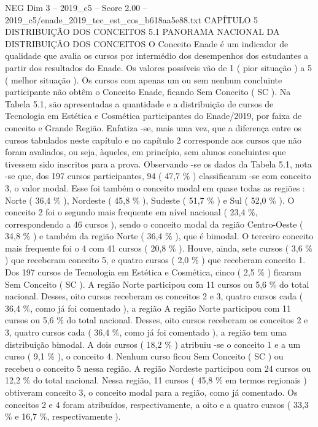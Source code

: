 \begin{textsample}{NEG Dim 3 – 2019\_c5 – Score 2.00 – 2019\_c5/enade\_2019\_tec\_est\_cos\_b618aa5e88.txt}  \label{ex:f3_neg_186}
CAPÍTULO 5 DISTRIBUIÇÃO DOS CONCEITOS 5.1 PANORAMA NACIONAL DA DISTRIBUIÇÃO DOS CONCEITOS O Conceito Enade é um indicador de qualidade que avalia os cursos por intermédio dos desempenhos dos estudantes a partir dos resultados do Enade.
Os valores possíveis vão de 1 ( pior situação ) a 5 ( melhor situação ).
Os cursos com apenas um ou sem nenhum concluinte participante não obtêm o Conceito Enade, ficando Sem Conceito ( SC ).
Na Tabela 5.1, são apresentadas a quantidade e a distribuição de cursos de Tecnologia em Estética e Cosmética participantes do Enade/2019, por faixa de conceito e Grande Região.
Enfatiza -se, mais uma vez, que a diferença entre os cursos tabulados neste capítulo e no capítulo 2 corresponde aos cursos que não foram avaliados, ou seja, àqueles, em princípio, sem alunos concluintes que tivessem sido inscritos para a prova.
Observando -se os dados da Tabela 5.1, nota -se que, dos 197 cursos participantes, 94 ( 47,7 \% ) classificaram -se com conceito 3, o valor modal.
Esse foi também o conceito modal em quase todas as regiões : Norte ( 36,4 \% ), Nordeste ( 45,8 \% ), Sudeste ( 51,7 \% ) e Sul ( 52,0 \% ).
O conceito 2 foi o segundo mais frequente em nível nacional ( 23,4 \%, correspondendo a 46 cursos ), sendo o conceito modal da região Centro-Oeste ( 34,8 \% ) e também da região Norte ( 36,4 \% ), que é bimodal.
O terceiro conceito mais frequente foi o 4 com 41 cursos ( 20,8 \% ).
Houve, ainda, sete cursos ( 3,6 \% ) que receberam conceito 5, e quatro cursos ( 2,0 \% ) que receberam conceito 1.
Dos 197 cursos de Tecnologia em Estética e Cosmética, cinco ( 2,5 \% ) ficaram Sem Conceito ( SC ).
A região Norte participou com 11 cursos ou 5,6 \% do total nacional.
Desses, oito cursos receberam os conceitos 2 e 3, quatro cursos cada ( 36,4 \%, como já foi comentado ), a região A região Norte participou com 11 cursos ou 5,6 \% do total nacional.
Desses, oito cursos receberam os conceitos 2 e 3, quatro cursos cada ( 36,4 \%, como já foi comentado ), a região tem uma distribuição bimodal.
A dois cursos ( 18,2 \% ) atribuiu -se o conceito 1 e a um curso ( 9,1 \% ), o conceito 4.
Nenhum curso ficou Sem Conceito ( SC ) ou recebeu o conceito 5 nessa região.
A região Nordeste participou com 24 cursos ou 12,2 \% do total nacional.
Nessa região, 11 cursos ( 45,8 \% em termos regionais ) obtiveram conceito 3, o conceito modal para a região, como já comentado.
Os conceitos 2 e 4 foram atribuídos, respectivamente, a oito e a quatro cursos ( 33,3 \% e 16,7 \%, respectivamente ).

\end{textsample}

